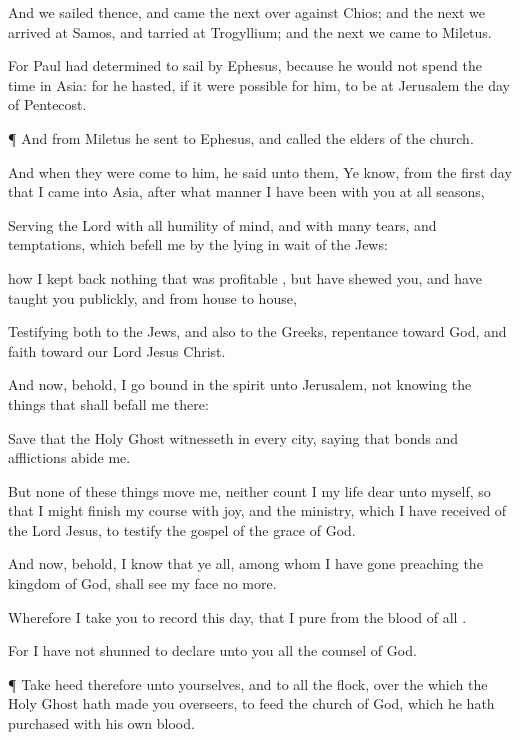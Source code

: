 {And we
sailed
thence, and
came the
next
{} over
against
Chios;
and the
next
{} we
arrived
at
Samos,
and
tarried
at
Trogyllium; and the
next
{} we
came
to
Miletus.

For
Paul had
determined to sail
by
Ephesus,
because
he
would
not spend the
time
in
Asia:
for he
hasted,
if it
were
possible for
him, to
be
at
Jerusalem the
day of
Pentecost.


\par }{\PP {}¶
And
from
Miletus he
sent
to
Ephesus, and
called the
elders of the
church.

And
when they were
come
to
him, he
said unto
them,
Ye
know,
from the
first
day
that I
came
into
Asia, after what
manner I have
been
with
you at
all
seasons,

Serving the
Lord
with
all humility of
mind,
and with
many
tears,
and
temptations, which
befell
me
by the lying in
wait of the
Jews:

how I kept
back
nothing that was
profitable
{},
but have
shewed
you,
and have
taught
you
publickly,
and
from house to
house,

Testifying
both to the
Jews, and
also to the
Greeks,
repentance
toward
God,
and
faith
toward
our
Lord
Jesus
Christ.

And
now,
behold,
I
go
bound in the
spirit
unto
Jerusalem,
not
knowing the
things
that shall
befall
me
there:

Save
that the
Holy
Ghost
witnesseth
in every
city,
saying
that
bonds
and
afflictions
abide
me.

But
none of these
things move
me,
neither count
I
my
life
dear unto
myself,
so that I might
finish
my
course
with
joy,
and the
ministry,
which I have
received
of the
Lord
Jesus, to
testify the
gospel of the
grace of
God.

And
now,
behold,
I
know
that
ye
all,
among
whom I have
gone
preaching the
kingdom of
God, shall
see
my
face no
more.

Wherefore I
take
you to
record
this
day,
that
I
{}
pure
from the
blood of
all
{}.

For I
have
not
shunned
to
declare unto
you
all the
counsel of
God.


\par }{\PP {}¶ Take
heed
therefore unto
yourselves,
and to
all the
flock,
over the
which the
Holy
Ghost hath
made
you
overseers, to
feed the
church of
God,
which he hath
purchased
with his
own
blood.

}
